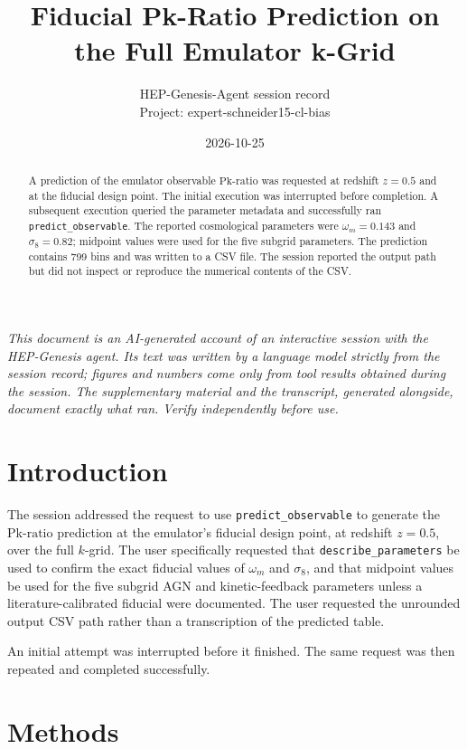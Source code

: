 \documentclass[11pt,a4paper]{article}
\title{Fiducial Pk-Ratio Prediction on the Full Emulator k-Grid}
\author{HEP-Genesis-Agent session record \\ \small Project: expert-schneider15-cl-bias}
\date{2026-10-25}
\begin{document}
\maketitle
\noindent\textit{\small This document is an AI-generated account of an interactive session with the HEP-Genesis agent. Its text was written by a language model strictly from the session record; figures and numbers come only from tool results obtained during the session. The supplementary material and the transcript, generated alongside, document exactly what ran. Verify independently before use.}
\vspace{1em}

\begin{abstract}
A prediction of the emulator observable \(\mathrm{Pk\mbox{-}ratio}\) was requested at redshift \(z=0.5\) and at the fiducial design point. The initial execution was interrupted before completion. A subsequent execution queried the parameter metadata and successfully ran \texttt{predict\_observable}. The reported cosmological parameters were \(\omega_m=0.143\) and \(\sigma_8=0.82\); midpoint values were used for the five subgrid parameters. The prediction contains 799 bins and was written to a CSV file. The session reported the output path but did not inspect or reproduce the numerical contents of the CSV.
\end{abstract}

\section{Introduction}

The session addressed the request to use \texttt{predict\_observable} to generate the \(\mathrm{Pk\mbox{-}ratio}\) prediction at the emulator's fiducial design point, at redshift \(z=0.5\), over the full \(k\)-grid. The user specifically requested that \texttt{describe\_parameters} be used to confirm the exact fiducial values of \(\omega_m\) and \(\sigma_8\), and that midpoint values be used for the five subgrid AGN and kinetic-feedback parameters unless a literature-calibrated fiducial were documented. The user requested the unrounded output CSV path rather than a transcription of the predicted table.

An initial attempt was interrupted before it finished. The same request was then repeated and completed successfully.

\section{Methods}
\end{document}
